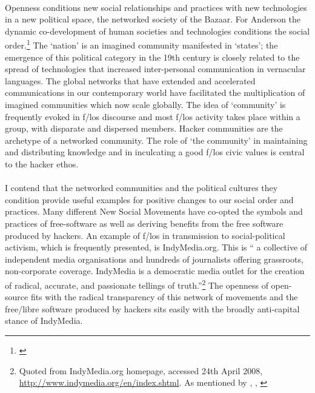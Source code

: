 \paragraph{}Openness conditions new social relationships and 
practices with new technologies in a new political space, the networked society of the Bazaar. For Anderson the dynamic co-development of human societies and technologies conditions the social order.\footnote{\cite{Anderson:1991ic}} The `nation' is an imagined community manifested in `states'; the emergence of this political category in the 19th century is closely related to the spread of technologies that increased inter-personal communication in vernacular languages. The global networks that have extended and accelerated communications in our contemporary world have facilitated the multiplication of imagined communities which now scale globally. The idea of `community' is frequently evoked in f/los discourse and most f/los activity takes place within a group, with disparate and dispersed members. Hacker communities are the archetype of a networked community. The role of `the community' in maintaining and distributing knowledge and in inculcating a good f/los civic values is central to the hacker ethos. 

\paragraph{}I contend that the networked communities and the political cultures they condition provide useful examples for positive changes to our social order and 
practices. Many different New Social Movements have co-opted the symbols and 
practices of free-software as well as deriving benefits from the free software produced by hackers. An example of f/los in transmission to social-political activism, which is frequently presented, is IndyMedia.org. This is `` a collective of independent media organisations and hundreds of journalists offering grassroots, non-corporate coverage. IndyMedia is a democratic media outlet for the creation of radical, accurate, and passionate tellings of truth.''\footnote{Quoted from IndyMedia.org homepage, accessed 24th April 2008, \url{http://www.indymedia.org/en/index.shtml}. As mentioned by \cite{Prug:2007fs}, \cite{Boomen:2005uq}, \cite{coleman:2004fo}} The openness of open-source fits with the radical transparency of this network of movements and the free/libre software produced by hackers sits easily with the broadly anti-capital stance of IndyMedia.

